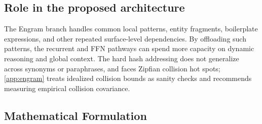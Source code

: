 \documentclass[preprint,12pt]{elsarticle}
\begin{document}
\subsection{Role in the proposed architecture}

The Engram branch handles common local patterns, entity fragments, boilerplate expressions, and other repeated surface-level dependencies. By offloading such patterns, the recurrent and FFN pathways can spend more capacity on dynamic reasoning and global context. The hard hash addressing does not generalize across synonyms or paraphrases, and faces Zipfian collision hot spots; \ref{app:engram} treats idealized collision bounds as sanity checks and recommends measuring empirical collision covariance.

\subsection{Mathematical Formulation}
\end{document}
